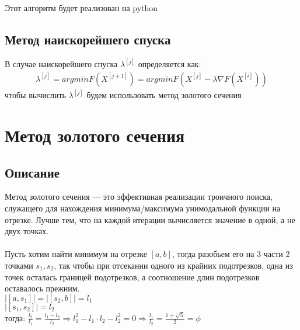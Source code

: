 \documentclass{article}
\begin{document}
    Этот алгоритм будет реализован на python

    \subsection{Метод наискорейшего спуска}
    В случае наискорейшего спуска $\lambda^{[j]}$ определяется как:\\
    \begin{gather*}
        \lambda^{[j]}=argmin F(X^{[j+1]}) = argmin F(X^{[j]} - \lambda\nabla F(X^{[i]}))
    \end{gather*}
    чтобы вычислить $\lambda^{[j]}$ будем использовать метод золотого сечения




































    \newpage


    \section{Метод золотого сечения}

    \subsection{Описание}

    Метод золотого сечения — это эффективная реализации троичного поиска, служащего для нахождения минимума/максимума унимодальной функции на отрезке. Лучше тем, что на каждой итерации вычисляется значение в одной, а не двух точках.\\\\
    Пусть хотим найти минимум на отрезке $[a, b]$, тогда разобьем его на 3 части 2 точками $s_1, s_2$, так чтобы при отсекании одного из крайних подотрезков, одна из точек осталась границей подотрезков, а соотношение длин подотрезков оставалось прежним.\\
    $|[a, s_1]|=|[s_2, b]|=l_1$\\
    $|[s_1, s_2]|=l_2$\\
    тогда: $\frac{l_2}{l_1}=\frac{l_1-l_2}{l_2} \Rightarrow l_1^2-l_1\cdot{l_2}-l_2^2=0 \Rightarrow \frac{l_1}{l_2}=\frac{1+\sqrt{5}}{2}=\phi$
\end{document}
